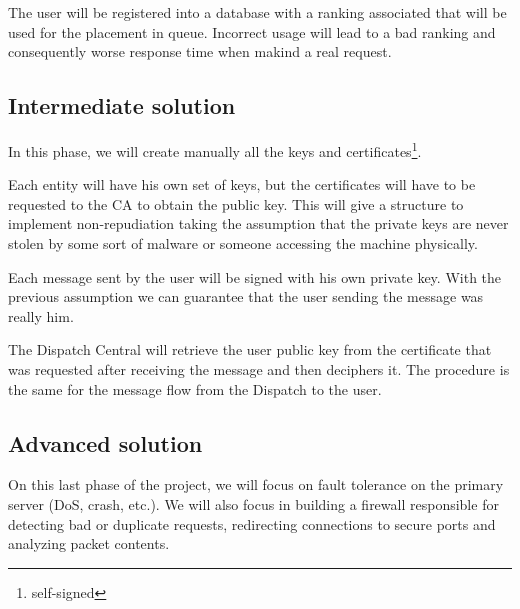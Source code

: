 \documentclass[a4paper,titlepage,11pt]{article}
\begin{document}
The user will be registered into a database with a ranking associated that will be used for the placement in queue.
Incorrect usage will lead to a bad ranking and consequently worse response time when makind a real request.

\subsection{Intermediate solution}
In this phase, we will create manually all the keys and certificates\footnote{self-signed}.

Each entity will have his own set of keys, but the certificates will have to be requested to the CA to obtain the public key.
This will give a structure to implement non-repudiation taking the assumption that the private keys are never stolen
by some sort of malware or someone accessing the machine physically.

Each message sent by the user will be signed with his own private key.
With the previous assumption we can guarantee that the user sending the message was really him.

The Dispatch Central will retrieve the user public key from the certificate that was requested after receiving the message and then deciphers it.
The procedure is the same for the message flow from the Dispatch to the user.

\subsection{Advanced solution}
On this last phase of the project, we will focus on fault tolerance on the primary server (DoS, crash, etc.).
We will also focus in building a firewall responsible for detecting bad or duplicate requests,
redirecting connections to secure ports and analyzing packet contents.
\end{document}
